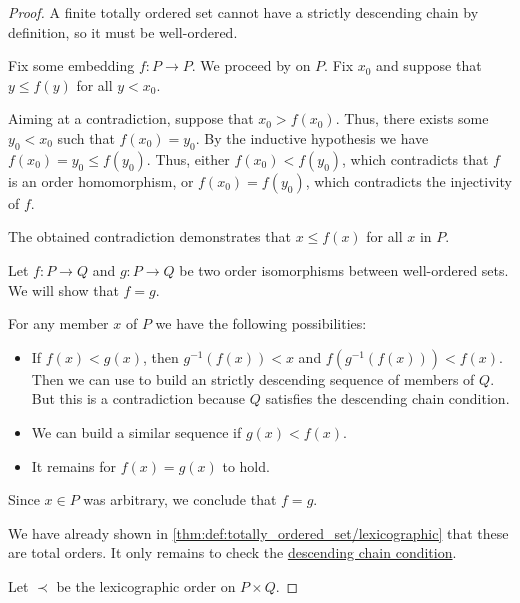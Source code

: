 \begin{proof}
   A finite totally ordered set cannot have a strictly descending chain by definition, so it must be well-ordered.

   Fix some embedding \( f: P \to P \). We proceed by  on \( P \). Fix \( x_0 \) and suppose that \( y \leq f(y) \) for all \( y < x_0 \).

  Aiming at a contradiction, suppose that \( x_0 > f(x_0) \). Thus, there exists some \( y_0 < x_0 \) such that \( f(x_0) = y_0 \). By the inductive hypothesis we have \( f(x_0) = y_0 \leq f(y_0) \). Thus, either \( f(x_0) < f(y_0) \), which contradicts that \( f \) is an order homomorphism, or \( f(x_0) = f(y_0) \), which contradicts the injectivity of \( f \).

  The obtained contradiction demonstrates that \( x \leq f(x) \) for all \( x \) in \( P \).

   Let \( f: P \to Q \) and \( g: P \to Q \) be two order isomorphisms between well-ordered sets. We will show that \( f = g \).

  For any member \( x \) of \( P \) we have the following possibilities:
  \begin{itemize}
    \item If \( f(x) < g(x) \), then \( g^{-1}(f(x)) < x \) and \( f(g^{-1}(f(x))) < f(x) \). Then we can use  to build an strictly descending sequence of members of \( Q \). But this is a contradiction because \( Q \) satisfies the descending chain condition.

    \item We can build a similar sequence if \( g(x) < f(x) \).

    \item It remains for \( f(x) = g(x) \) to hold.
  \end{itemize}

  Since \( x \in P \) was arbitrary, we conclude that \( f = g \).

   We have already shown in \cref{thm:def:totally_ordered_set/lexicographic} that these are total orders. It only remains to check the \hyperref[def:chain_condition]{descending chain condition}.

  Let \( \prec \) be the lexicographic order on \( P \times Q \).


\end{proof}
